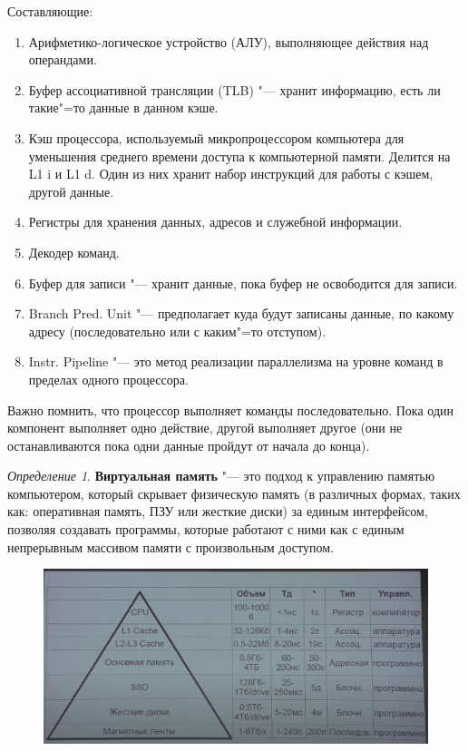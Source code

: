 \documentclass[bachelor, och, book]{SCWorks}
\theoremstyle{remark}
\newtheorem{definition}{Определение}
\begin{document}
    Составляющие: 
    
    \begin{enumerate}
        \item Арифметико-логическое устройство (АЛУ), выполняющее действия над операндами.
        \item Буфер ассоциативной трансляции (TLB) "--- хранит информацию, есть ли такие"=то данные в данном кэше.
        \item Кэш процессора, используемый микропроцессором компьютера для уменьшения среднего времени доступа к компьютерной памяти. Делится на L1 i и L1 d. Один из них хранит набор инструкций для работы с кэшем, другой данные.
        \item Регистры для хранения данных, адресов и служебной информации.
        \item Декодер команд.
        \item Буфер для записи "--- хранит данные, пока буфер не освободится для записи.
        \item Branch Pred. Unit "--- предполагает куда будут записаны данные, по какому адресу (последовательно или с каким"=то отступом).
        \item Instr. Pipeline "--- это метод реализации параллелизма на уровне команд в пределах одного процессора.
    \end{enumerate}

    \hfill \break
    Важно помнить, что процессор выполняет команды последовательно. Пока один компонент выполняет одно действие, другой выполняет другое (они не останавливаются пока одни данные пройдут от начала до конца).

    \begin{definition}
        \textbf{Виртуальная память} "--- это подход к управлению памятью компьютером, который скрывает физическую память (в различных формах, таких как: оперативная память, ПЗУ или жесткие диски) за единым интерфейсом, позволяя создавать программы, которые работают с ними как с единым непрерывным массивом памяти с произвольным доступом.
    \end{definition}

    \begin{figure}[H]
        \begin{center}
            \includegraphics[scale=0.4]{res/memory-pyramid.png}
        \end{center}
    \end{figure}
\end{document}
